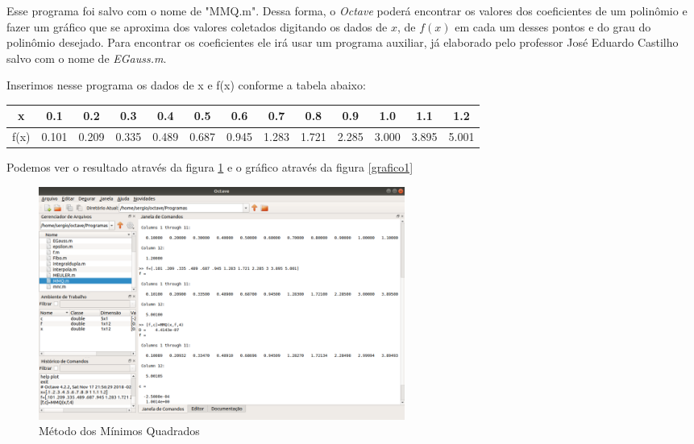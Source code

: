 \documentclass[11pt, openright, a4paper, brazil, openany, oneside]{abntex2}
\begin{document}
Esse programa foi salvo com o nome de "MMQ.m". Dessa forma, o \textit{Octave} poderá encontrar os valores dos coeficientes de um polinômio e fazer um gráfico que se aproxima dos valores coletados digitando os dados de $x$, de $f(x)$ em cada um desses pontos e do grau do polinômio desejado. Para encontrar os coeficientes ele irá usar um programa auxiliar, já elaborado pelo professor José Eduardo Castilho salvo com o nome de \textit{EGauss.m}.

Inserimos nesse programa os dados de x e f(x) conforme a tabela abaixo:

\begin{table}[ht]
\centering
\begin{tabular}{|c|c|c|c|c|c|c|c|c|c|c|c|c|}
\hline
x & 0.1 & 0.2 & 0.3 & 0.4 & 0.5 & 0.6 & 0.7 & 0.8 & 0.9 & 1.0 & 1.1 & 1.2 \\ 
\hline
f(x) & 0.101 & 0.209 & 0.335 & 0.489 & 0.687 & 0.945 & 1.283 & 1.721 & 2.285 & 3.000 & 3.895 & 5.001\\ 
\hline

\end{tabular}
\end{table}

Podemos ver o resultado através da figura \ref{octave1} e o gráfico através da figura \ref{grafico1}

\begin{figure}[ht]

    \center

    \includegraphics[width=12cm]{octave1.png}
    \caption{Método dos Mínimos Quadrados \label{octave1}}
    
\end{figure}
\end{document}
